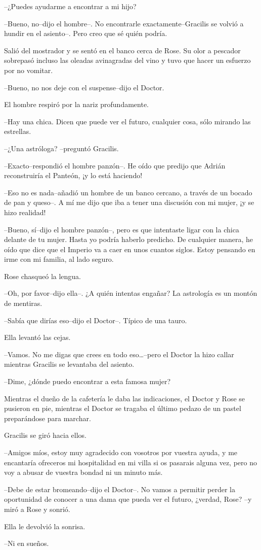 --¿Puedes ayudarme a encontrar a mi hijo?

--Bueno, no--dijo el hombre--. No encontrarle exactamente--Gracilis se
volvió a hundir en el asiento--. Pero creo que sé quién podría.

Salió del mostrador y se sentó en el banco cerca de Rose. Su olor a
pescador sobrepasó incluso las oleadas avinagradas del vino y tuvo que
hacer un esfuerzo por no vomitar.

--Bueno, no nos deje con el suspense--dijo el Doctor.

El hombre respiró por la nariz profundamente.

--Hay una chica. Dicen que puede ver el futuro, cualquier cosa, sólo
mirando las estrellas.

--¿Una astróloga? --preguntó Gracilis.

--Exacto--respondió el hombre panzón--. He oído que predijo que Adrián
reconstruiría el Panteón, ¡y lo está haciendo!

--Eso no es nada--añadió un hombre de un banco cercano, a través de un
bocado de pan y queso--. A mí me dijo que iba a tener una discusión con
mi mujer, ¡y se hizo realidad!

--Bueno, sí--dijo el hombre panzón--, pero es que intentaste ligar con
la chica delante de tu mujer. Hasta yo podría haberlo predicho. De
cualquier manera, he oído que dice que el Imperio va a caer en unos
cuantos siglos. Estoy pensando en irme con mi familia, al lado seguro.

Rose chasqueó la lengua.

--Oh, por favor--dijo ella--. ¿A quién intentas engañar? La astrología
es un montón de mentiras.

--Sabía que dirías eso--dijo el Doctor--. Típico de una tauro.

Ella levantó las cejas.

--Vamos. No me digas que crees en todo eso\ldots{}--pero el Doctor la
hizo callar mientras Gracilis se levantaba del asiento.

--Dime, ¿dónde puedo encontrar a esta famosa mujer?

Mientras el dueño de la cafetería le daba las indicaciones, el Doctor y
Rose se pusieron en pie, mientras el Doctor se tragaba el último pedazo
de un pastel preparándose para marchar.

Gracilis se giró hacia ellos.

--Amigos míos, estoy muy agradecido con vosotros por vuestra ayuda, y me
encantaría ofreceros mi hospitalidad en mi villa si os pasarais alguna
vez, pero no voy a abusar de vuestra bondad ni un minuto más.

--Debe de estar bromeando--dijo el Doctor--. No vamos a permitir perder
la oportunidad de conocer a una dama que pueda ver el futuro, ¿verdad,
Rose? --y miró a Rose y sonrió.

Ella le devolvió la sonrisa.

--Ni en sueños.